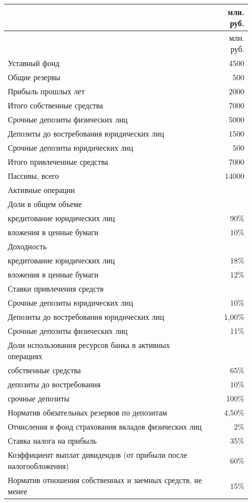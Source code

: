 \documentclass[12pt, table]{exam}
\begin{document}
\begin{questions}
\begin{tabularx}{\linewidth}[b]{@{}>{\raggedright\arraybackslash}Xr@{}}	
	& млн. руб. \\
	\midrule
    & млн. руб. \\
	Уставный фонд & 4500 \\
	Общие резервы & 500 \\
	Прибыль прошлых лет & 2000 \\
	Итого собственные средства & 7000 \\
	Срочные депозиты физических лиц & 5000 \\
	Депозиты до востребования юридических лиц & 1500 \\
	Срочные депозиты юридических лиц & 500 \\
	Итого привлеченные средства & 7000 \\
	Пассивы, всего & 14000 \\
	Активные операции &  \\
	Доли в общем объеме &  \\
	кредитование юридических лиц & 90\% \\
	вложения в ценные бумаги & 10\% \\
	Доходность &  \\
	кредитование юридических лиц & 18\% \\
	вложения в ценные бумаги & 12\% \\
	Ставки привлечения средств &  \\
	Срочные депозиты юридических лиц & 10\% \\
	Депозиты до востребования юридических лиц & 1,00\% \\
	Срочные депозиты физических лиц & 11\% \\
	Доли использования ресурсов банка в активных операциях &  \\
	собственные средства & 65\% \\
	депозиты до востребования & 10\% \\
	срочные депозиты & 100\% \\
	Норматив обязательных резервов по депозитам & 4,50\% \\
	Отчисления в фонд страхования вкладов физических лиц & 2\% \\
	Ставка налога на прибыль & 35\% \\
	Коэффициент выплат дивидендов (от прибыли после налогообложения) & 60\% \\
	Норматив отношения собственных и заемных средств, не менее & 15\% \\
	\bottomrule
\end{tabularx}%
\noaddpoints


\end{questions}
\end{document}
